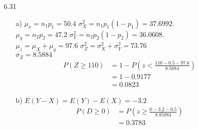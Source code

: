 \documentclass{article}
\begin{document}
\begin{itemize}
\begin{itemize}
    \end{itemize}
    \item [6.31]
    \begin{itemize}
        \item [a)] \(\mu_x=n_1p_1=50.4\) \(\sigma_X^2 = n_1p_1(1-p_1)=37.6992\).\\
                    \(\mu_y=n_2p_2=47.2\) \(\sigma_Y^2 = n_2p_2(1-p_2)=36.0608\).\\
                    \(\mu_z=\mu_X+\mu_y = 97.6\) \(\sigma_Z^2 = \sigma_X^2+\sigma_Y^2=73.76\)\\
                    \(\sigma_Z = 8.5884\)\\
                    \begin{align*}
                        P(Z\geq 110)&=1-P(z<\frac{110-0.5-97.6}{8.5884})\\
                        &=1-0.9177\\
                        &=0.0823 
                    \end{align*}
        \item [b)] \(E(Y-X)=E(Y)-E(X)=-3.2\)
        \begin{align*}
            P(D\geq 0)&=P(z\geq \frac{0-3.2-0.5}{8.85884})\\
            &=0.3783
        \end{align*}


\end{itemize}
\end{itemize}
\end{document}
